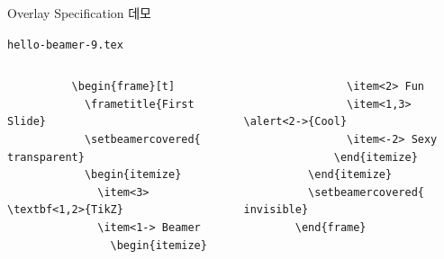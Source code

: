 \documentclass[compress]{beamer}
\begin{document}
\begin{frame}[fragile=singleslide]{Overlay Specification 데모}
  \begin{block}{\texttt{hello-beamer-9.tex}}
    \begin{columns}
      \begin{column}{0.45\textwidth}
        \begin{verbatim}
          \begin{frame}[t]
            \frametitle{First Slide}
            \setbeamercovered{ transparent}
            \begin{itemize}
              \item<3> \textbf<1,2>{TikZ}
              \item<1-> Beamer
                \begin{itemize}
        \end{verbatim}
      \end{column}
      \begin{column}{0.45\textwidth}
      \begin{verbatim}
                \item<2> Fun
                \item<1,3> \alert<2->{Cool}
                \item<-2> Sexy
              \end{itemize}
          \end{itemize}
          \setbeamercovered{ invisible}
        \end{frame}
      \end{verbatim}
      \end{column}
    \end{columns}
    \begin{center}
    \end{center}
  \end{block}
\end{frame}
\end{document}
